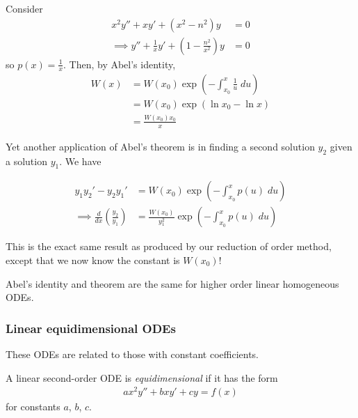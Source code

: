 \documentclass{../../template/note}
\begin{document}
    \begin{example}
        Consider
        \begin{align*}
            x^2 y'' + xy' + (x^2-n^2)y &= 0 \\
            \implies y'' + \frac{1}{x}y' + \left(1- \frac{n^2}{x^2}\right)y &= 0
        \end{align*}
        so \(p(x) = \frac{1}{x}\). Then, by Abel's identity,
        \begin{align*}
            W(x) &= W(x_0) \exp\left(-\int_{x_0}^x \frac{1}{u} \; du\right) \\
            &= W(x_0) \exp(\ln x_0 - \ln x) \\
            &= \frac{W(x_0)x_0}{x}
        \end{align*}
    \end{example}
    
    Yet another application of Abel's theorem is in finding a second solution \(y_2\) given a solution \(y_1\). We have
    
    \begin{align*}
        y_1y_2' - y_2y_1' &= W(x_0) \exp\left(-\int_{x_0}^x p(u) \; du \right) \\
        \implies \frac{d}{dx} \left(\frac{y_2}{y_1}\right) &= \frac{W(x_0)}{y_1^2} \exp\left(-\int_{x_0}^x p(u) \; du \right)
    \end{align*}
    
    This is the exact same result as produced by our reduction of order method, except that we now know the constant is \(W(x_0)\)!

    \begin{remark*}
        Abel's identity and theorem are the same for higher order linear homogeneous ODEs.
    \end{remark*}

    \subsubsection{Linear equidimensional ODEs}

    These ODEs are related to those with constant coefficients.

    \begin{definition}
        A linear second-order ODE is \emph{equidimensional} if it has the form
        \begin{align*}
            ax^2y'' + bxy' + cy = f(x)
        \end{align*}
        for constants \(a\), \(b\), \(c\).
    \end{definition}
\end{document}
